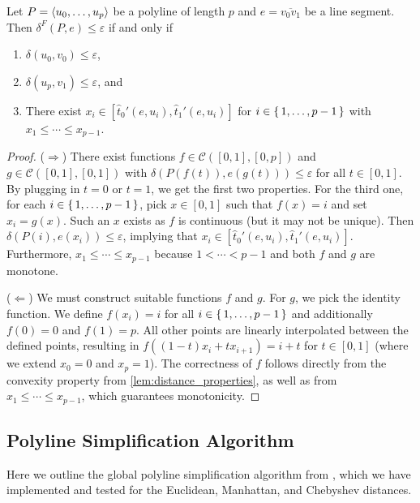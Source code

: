 \begin{lemma}\label{lem:ag-neq}
	Let \(P = \left\langle u_0, \dots, u_p\right\rangle\) be a polyline of length \(p\) and \(e = \overline{v_0v_1}\) be a line segment. Then 
	\(\delta^F(P, e) \leq \varepsilon\) if and only if
	\begin{enumerate}
		\item \(\delta(u_0, v_0) \leq \varepsilon\),
		\item \(\delta(u_p, v_1) \leq \varepsilon\), and
		\item There exist \(x_i \in [\hat t_0'(e, u_i), \hat t_1'(e, u_i)]\) for \(i \in \set{1, \dots, p - 1}\) with \(x_1 \leq \cdots \leq x_{p-1}\).
	\end{enumerate}
\end{lemma}
\begin{proof}
	(\(\Rightarrow\)) There exist functions \(f \in \mathcal{C}([0,1], [0, p])\) and \(g \in \mathcal{C}([0,1], [0, 1])\) with \(\delta(P(f(t)), e(g(t))) \leq \varepsilon\) for all \(t \in [0, 1]\). By plugging in \(t=0\) or \(t=1\), we get the first two properties. For the third one, for each \(i \in \set{1, \dots, p-1}\), pick \(x \in [0, 1]\) such that \(f(x) = i\) and set \(x_i = g(x)\). Such an \(x\) exists as \(f\) is continuous (but it may not be unique). Then \(\delta(P(i), e(x_i)) \leq \varepsilon \), implying that \(x_i \in [\hat t_0'(e, u_i), \hat t_1'(e, u_i)]\). Furthermore, \(x_1 \leq \cdots \leq x_{p-1}\) because \(1 < \cdots < p-1\) and both \(f\) and \(g\) are monotone.

	(\(\Leftarrow\)) We must construct suitable functions \(f\) and \(g\). For \(g\), we pick the identity function. We define \(f(x_i) = i\) for all \(i \in \set{1, \dots, p - 1}\) and additionally \(f(0) = 0\) and \(f(1) = p\). All other points are linearly interpolated between the defined points, resulting in \(f((1-t)x_i + tx_{i+1}) = i + t\) for \(t\in [0,1]\) (where we extend \(x_0 = 0\) and \(x_p = 1\)). The correctness of \(f\) follows directly from the convexity property from \cref{lem:distance_properties}, as well as from \(x_1 \leq \cdots \leq x_{p-1}\), which guarantees monotonicity.
\end{proof}

\subsection{Polyline Simplification Algorithm}
\label{ssec:simple_algo_main}

Here we outline the global polyline simplification algorithm from \citeauthor{on_optimal_polyline_simplification_using_the_hausdorff_and_frechet_distance}, which we have implemented and tested for the Euclidean, Manhattan, and Chebyshev distances.

